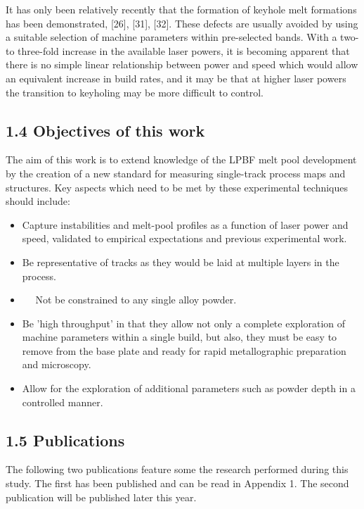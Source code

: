 \documentclass[10pt]{article}
\begin{document}
It has only been relatively recently that the formation of keyhole melt formations has been demonstrated, [26], [31], [32]. These defects are usually avoided by using a suitable selection of machine parameters within pre-selected bands. With a two- to three-fold increase in the available laser powers, it is becoming apparent that there is no simple linear relationship between power and speed which would allow an equivalent increase in build rates, and it may be that at higher laser powers the transition to keyholing may be more difficult to control.

\subsection*{1.4 Objectives of this work}
The aim of this work is to extend knowledge of the LPBF melt pool development by the creation of a new standard for measuring single-track process maps and structures. Key aspects which need to be met by these experimental techniques should include:

\begin{itemize}
  \item Capture instabilities and melt-pool profiles as a function of laser power and speed, validated to empirical expectations and previous experimental work.

  \item Be representative of tracks as they would be laid at multiple layers in the process.

  \item $\quad$ Not be constrained to any single alloy powder.

  \item Be 'high throughput' in that they allow not only a complete exploration of machine parameters within a single build, but also, they must be easy to remove from the base plate and ready for rapid metallographic preparation and microscopy.

  \item Allow for the exploration of additional parameters such as powder depth in a controlled manner.

\end{itemize}

\subsection*{1.5 Publications}
The following two publications feature some the research performed during this study. The first has been published and can be read in Appendix 1. The second publication will be published later this year.
\end{document}
